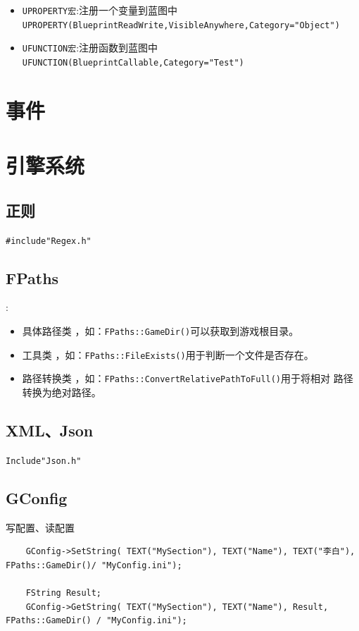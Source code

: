 \documentclass[UTF8,a4paper,12pt]{ctexbook}
\begin{document}
		\begin{itemize}
			\item \verb|UPROPERTY宏|:注册一个变量到蓝图中\verb|UPROPERTY(BlueprintReadWrite,VisibleAnywhere,Category="Object")|
			\item \verb|UFUNCTION宏|:注册函数到蓝图中 \verb|UFUNCTION(BlueprintCallable,Category="Test")|
		\end{itemize}
	
		
\chapter{事件}


\chapter{引擎系统}
	\section{正则}
		\verb|#include"Regex.h"|
	
	\section{FPaths}:
		\begin{itemize}
			\item 具体路径类 ，如：\verb|FPaths::GameDir()|可以获取到游戏根目录。
			\item 工具类 ，如：\verb|FPaths::FileExists()|用于判断一个文件是否存在。
			\item 路径转换类 ，如：\verb|FPaths::ConvertRelativePathToFull()|用于将相对 路径转换为绝对路径。
		\end{itemize}
	
		
	\section{XML、Json}
		\verb|Include"Json.h"|
	
	\section{GConfig}
		写配置、读配置
		
		\begin{lstlisting}
	GConfig->SetString( TEXT("MySection"), TEXT("Name"), TEXT("李白"), FPaths::GameDir()/ "MyConfig.ini");
	
	FString Result; 
	GConfig->GetString( TEXT("MySection"), TEXT("Name"), Result, FPaths::GameDir() / "MyConfig.ini");
		\end{lstlisting}
	
\end{document}

